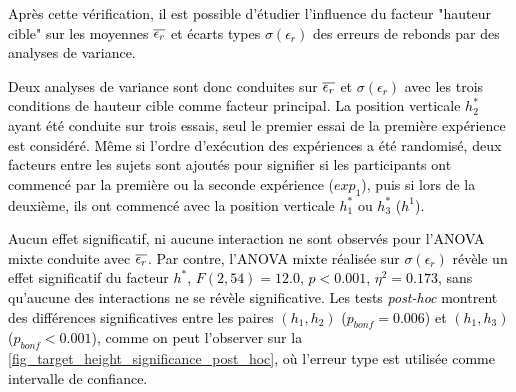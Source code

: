 \textcolor{black}{Après cette vérification, il est possible d'étudier l'influence du facteur "hauteur cible" sur les moyennes $\overline{\epsilon_r}$ et écarts types $\sigma(\epsilon_r)$ des erreurs de rebonds par des analyses de variance.}


\textcolor{black}{Deux analyses de variance sont donc conduites sur $\overline{\epsilon_r}$ et $\sigma(\epsilon_r)$ avec les trois conditions de hauteur cible comme facteur principal. La position verticale $h_2^*$ ayant été conduite sur trois essais, seul le premier essai de la première expérience est considéré. Même si l'ordre d'exécution des expériences a été randomisé, deux facteurs entre les sujets sont ajoutés pour signifier si les participants ont commencé par la première ou la seconde expérience ($exp_1$), puis si lors de la deuxième, ils ont commencé avec la position verticale $h_1^*$ ou $h_3^*$ ($h^1$).}

\textcolor{black}{Aucun effet significatif, ni aucune interaction ne sont observés pour l'ANOVA mixte conduite avec $\overline{\epsilon_r}$. Par contre, l'ANOVA mixte réalisée sur $\sigma(\epsilon_r)$ révèle un effet significatif du facteur $h^*$, $F(2, 54) = 12.0$, $p<0.001$,  $\eta^2 = 0.173$, sans qu'aucune des interactions ne se révèle significative. Les tests \textit{post-hoc} montrent des différences significatives entre les paires $(h_1,h_2)$ ($p_{bonf} = 0.006$) et $(h_1,h_3)$ ($p_{bonf} < 0.001$), comme on peut l'observer sur la \cref{fig_target_height_significance_post_hoc}, où l'erreur type est utilisée comme intervalle de confiance.}

